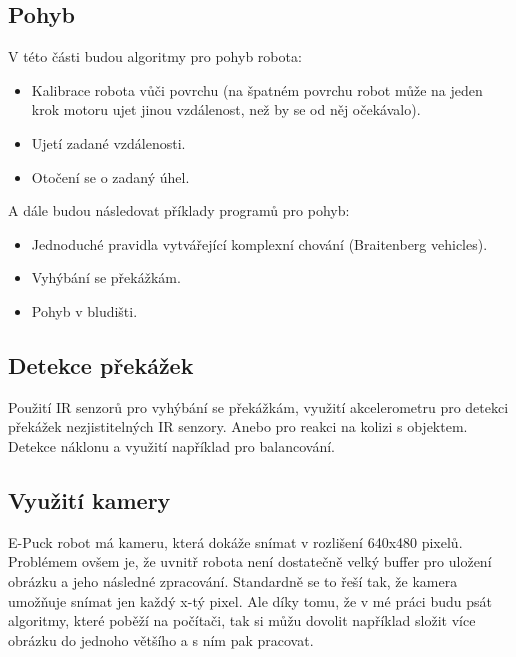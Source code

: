 \documentclass[11pt]{article}
\begin{document}
\subsection{Pohyb}

V této části budou algoritmy pro pohyb robota:
\begin{itemize}
\item Kalibrace robota vůči povrchu (na špatném povrchu robot může na jeden krok
motoru ujet jinou vzdálenost, než by se od něj očekávalo).
\item Ujetí zadané vzdálenosti.
\item Otočení se o zadaný úhel.
\end{itemize}
A dále budou následovat příklady programů pro pohyb:
\begin{itemize}
\item Jednoduché pravidla vytvářející komplexní chování (Braitenberg vehicles).
\item Vyhýbání se překážkám.
\item Pohyb v bludišti.
\end{itemize}

\subsection{Detekce překážek}
Použití IR senzorů pro vyhýbání se překážkám, využití akcelerometru pro detekci
překážek nezjistitelných IR senzory. Anebo pro reakci na kolizi s objektem.
Detekce náklonu a využití například pro balancování.

\subsection{Využití kamery}
E-Puck robot má kameru, která dokáže snímat v rozlišení 640x480 pixelů.
Problémem ovšem je, že uvnitř robota není dostatečně velký buffer pro uložení
obrázku a jeho následné zpracování. Standardně se to řeší tak, že kamera
umožňuje snímat jen každý x-tý pixel. Ale díky tomu, že v mé práci budu psát
algoritmy, které poběží na počítači, tak si můžu dovolit například složit více
obrázku do jednoho většího a s ním pak pracovat.
\end{document}
